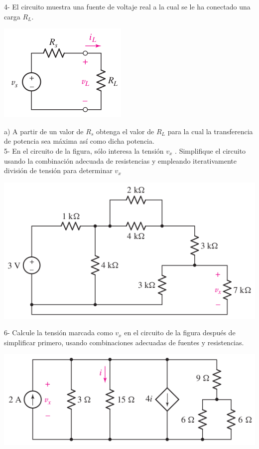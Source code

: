 \documentclass[10pt,letterpaper]{article}
\begin{document}
4- El circuito muestra una fuente de voltaje real a la cual se le ha conectado una carga $R_L$.

	\includegraphics[width=.3\linewidth]{c4}

a) A partir de un valor de $R_s$ obtenga el valor de $R_L$ para la cual la transferencia de potencia sea máxima así como dicha potencia.
\\

%

5- En el circuito de la figura, sólo interesa la tensión $v_x$ . Simplifique el circuito usando la combinación adecuada de resistencias y empleando iterativamente división de tensión para determinar $v_x$

\includegraphics[width=.5\linewidth]{ej5}


6- Calcule la tensión marcada como $v_x$ en el circuito de la figura después de simplificar primero, usando combinaciones adecuadas de fuentes y resistencias.

\includegraphics[width=.5\linewidth]{ej6}
\end{document}
